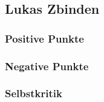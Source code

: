 \subsection{Lukas Zbinden}

\subsubsection{Positive Punkte}

\subsubsection{Negative Punkte}

\subsubsection{Selbstkritik}
